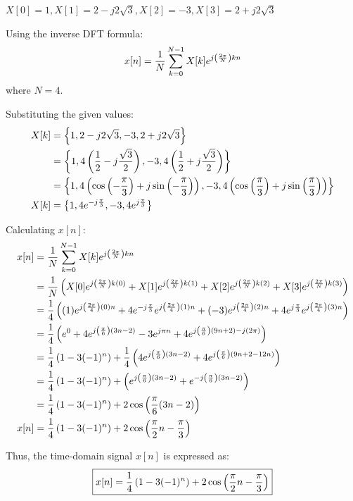 \documentclass[a4paper, 10pt]{article}
\begin{document}
\newpage

\begin{tosubmit}
\begin{subsubproblems}[start=3]
    \item \( X[0] = 1, X[1] = 2 - j 2\sqrt{3}, X[2] = -3, X[3] = 2 + j 2\sqrt{3} \)
\end{subsubproblems}

\par\noindent\submitsolution
Using the inverse DFT formula:
\[ x[n] = \frac{1}{N} \sum_{k=0}^{N-1} X[k] e^{j \left( \frac{2\pi}{N} \right) kn} \]
where \( N = 4 \).

\vspace{2mm}

Substituting the given values:
\begin{align*}
    X[k] &= \left\{ 1, 2 - j 2\sqrt{3}, -3, 2 + j 2\sqrt{3} \right\} \\
    &= \left\{ 1, 4 \left( \frac{1}{2} - j \frac{\sqrt{3}}{2} \right), -3, 4 \left( \frac{1}{2} + j \frac{\sqrt{3}}{2} \right) \right\} \\
    &= \left\{ 1, 4 \left( \cos{ \left( -\frac{\pi}{3} \right) } + j \sin{ \left( -\frac{\pi}{3} \right) } \right), -3, 4 \left( \cos{ \left( \frac{\pi}{3} \right) } + j \sin{ \left( \frac{\pi}{3} \right) } \right) \right\} \\
    X[k] &= \left\{ 1, 4 e^{-j\frac{\pi}{3}}, -3, 4 e^{j\frac{\pi}{3}} \right\}
\end{align*}

Calculating \( x[n] \):
\begin{align*}
    x[n] &= \frac{1}{N} \sum_{k=0}^{N-1} X[k] e^{j \left( \frac{2\pi}{N} \right) kn} \\
    &= \frac{1}{N} \left( X[0] e^{j \left( \frac{2\pi}{N} \right) k(0)} + X[1] e^{j \left( \frac{2\pi}{N} \right) k(1)} + X[2] e^{j \left( \frac{2\pi}{N} \right) k(2)} + X[3] e^{j \left( \frac{2\pi}{N} \right) k(3)} \right) \\
    &= \frac{1}{4} \left( (1) e^{j \left( \frac{2\pi}{4} \right) ( 0 ) n} + 4 e^{-j\frac{\pi}{3}} e^{j \left( \frac{2\pi}{4} \right) ( 1 ) n} + (-3) e^{j \left( \frac{2\pi}{4} \right) ( 2 ) n} + 4 e^{j\frac{\pi}{3}} e^{j \left( \frac{2\pi}{4} \right) ( 3 ) n} \right) \\
    &= \frac{1}{4} \left( e^{ 0 } + 4 e^{j \left( \frac{\pi}{6} \right) (3n - 2)} - 3 e^{j \pi n} + 4 e^{j \left( \frac{\pi}{6} \right) (9n + 2) - j ( 2 \pi )} \right) \\
    &= \frac{1}{4} \left( 1 - 3(-1)^n \right) + \frac{1}{4} \left( 4 e^{j \left( \frac{\pi}{6} \right) (3n - 2)} + 4 e^{j \left( \frac{\pi}{6} \right) (9n + 2 - 12n)} \right) \\
    &= \frac{1}{4} \left( 1 - 3(-1)^n \right) + \left( e^{j \left( \frac{\pi}{6} \right) (3n - 2)} + e^{-j \left( \frac{\pi}{6} \right) (3n - 2)} \right) \\
    &= \frac{1}{4} \left( 1 - 3(-1)^n \right) + 2 \cos{\left( \frac{\pi}{6} (3n - 2)\right) } \\
    x[n] &= \frac{1}{4} \left( 1 - 3(-1)^n \right) + 2 \cos{\left( \frac{\pi}{2} n - \frac{\pi}{3}\right) }
\end{align*}

Thus, the time-domain signal \( x[n] \) is expressed as:
\[ \boxed{ x[n] = \frac{1}{4} \left( 1 - 3(-1)^n \right) + 2 \cos{\left( \frac{\pi}{2} n - \frac{\pi}{3}\right) } } \]
\end{tosubmit}
\end{document}
